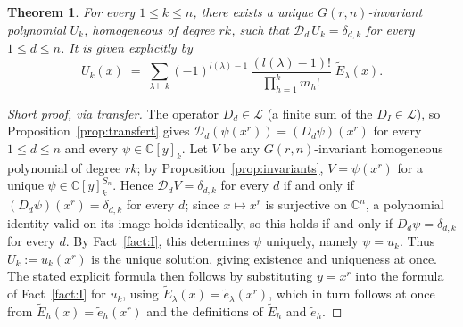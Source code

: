 \documentclass[11pt]{article}
\newtheorem{theorem}{Theorem}[section]
\theoremstyle{remark}
\newcommand{\CC}{\mathbb{C}}
\begin{document}
\begin{theorem}\label{thm:main}
For every $1\le k\le n$, there exists a unique $G(r,n)$-invariant polynomial $U_k$, homogeneous of degree $rk$, such that $\mathcal D_d\, U_k = \delta_{d,k}$ for every $1\le d\le n$. It is given explicitly by
\[
U_k(x) \;=\; \sum_{\lambda\vdash k} (-1)^{l(\lambda)-1}\,\frac{(l(\lambda)-1)!}{\prod_{h=1}^{k} m_h!}\; \widetilde E_\lambda(x).
\]
\end{theorem}

\begin{proof}[Short proof, via transfer]
The operator $D_d\in\mathcal L$ (a finite sum of the $D_I\in\mathcal L$), so Proposition~\ref{prop:transfert} gives $\mathcal D_d(\psi(x^r))=(D_d\psi)(x^r)$ for every $1\le d\le n$ and every $\psi\in\CC[y]_k$. Let $V$ be any $G(r,n)$-invariant homogeneous polynomial of degree $rk$; by Proposition~\ref{prop:invariants}, $V=\psi(x^r)$ for a unique $\psi\in\CC[y]^{S_n}_k$. Hence $\mathcal D_dV=\delta_{d,k}$ for every $d$ if and only if $(D_d\psi)(x^r)=\delta_{d,k}$ for every $d$; since $x\mapsto x^r$ is surjective on $\CC^n$, a polynomial identity valid on its image holds identically, so this holds if and only if $D_d\psi=\delta_{d,k}$ for every $d$. By Fact~\ref{fact:I}, this determines $\psi$ uniquely, namely $\psi=u_k$. Thus $U_k:=u_k(x^r)$ is the unique solution, giving existence and uniqueness at once. The stated explicit formula then follows by substituting $y=x^r$ into the formula of Fact~\ref{fact:I} for $u_k$, using $\widetilde E_\lambda(x)=\tilde e_\lambda(x^r)$, which in turn follows at once from $\widetilde E_h(x)=\tilde e_h(x^r)$ and the definitions of $\widetilde E_h$ and $\tilde e_h$.
\end{proof}
\end{document}
